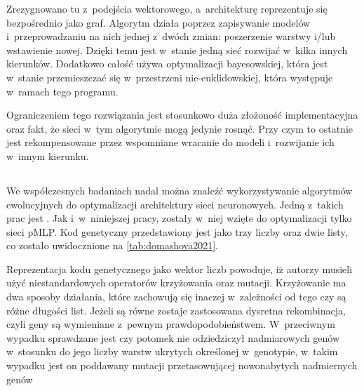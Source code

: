 Zrezygnowano tu z~podejścia wektorowego,
a~architekturę reprezentuje się
bezpośrednio jako graf.
Algorytm działa poprzez zapisywanie modelów
i~przeprowadzaniu na nich jednej z~dwóch zmian:
poszerzenie warstwy i/lub wstawienie nowej.
Dzięki temu jest w~stanie jedną sieć rozwijać
w~kilka innych kierunków.
Dodatkowo całość używa
optymalizacji bayesowskiej,
która jest w~stanie przemieszczać się
w~przestrzeni nie-euklidowskiej,
która występuje w~ramach tego programu.

Ograniczeniem tego rozwiązania jest stosunkowo
duża złożoność implementacyjna oraz fakt,
że sieci w~tym algorytmie mogą jedynie rosnąć.
Przy czym to ostatnie jest rekompensowane
przez wspomniane wracanie do modeli
i~rozwijanie ich w~innym kierunku.

\tocless\subsection{}
We współczesnych badaniach nadal można
znaleźć wykorzystywanie algorytmów ewolucyjnych
do optymalizacji architektury sieci neuronowych.
Jedną z~takich prac jest .
Jak i~w~niniejszej pracy, zostały w~niej
wzięte do optymalizacji tylko sieci \gls{pMLP}.
Kod genetyczny przedstawiony jest
jako trzy liczby oraz dwie listy,
co zostało uwidocznione na \cref{tab:domashova2021}.
\begin{table}
  \centering
  
  \caption{
    Przykładowe kody genetyczne
    z~.
    Osobnik reprezentuje liczbę epok,
    rozmiar wsadu (ang. \textit{batch}),
    liczbę warstw ukrytych
    oraz dwie listy zawierające:
    liczbę neuronów w~poszczególnych warstwach
    i~ich funkcje aktywacji (kodowane numerycznie:
    0 dla ReLU, 1 dla tangensa hiperbolicznego,
    2 dla funkcji sigmoidalnej).
  }
  \label{tab:domashova2021}
\end{table}

Reprezentacja kodu genetycznego
jako wektor liczb powoduje,
iż autorzy musieli użyć
niestandardowych operatorów
krzyżowania oraz mutacji.
Krzyżowanie ma dwa sposoby działania,
które zachowują się inaczej w~zależności
od tego czy są różne długości list.
Jeżeli są równe zostaje zastosowana
dysretna rekombinacja, czyli geny
są wymieniane z~pewnym prawdopodobieństwem.
W~przeciwnym wypadku sprawdzane jest
czy potomek nie odziedziczył nadmiarowych
genów w~stosunku do jego liczby warstw
ukrytych określonej w~genotypie,
w~takim wypadku jest on poddawany mutacji
przetasowującej nowonabytych nadmiernych genów


